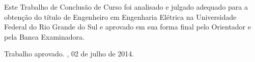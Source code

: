 \documentclass[
	12pt,				%
	openright,			%
	twoside,			%
	a4paper,			%
	brazil,
	french,				%
	english
	]{abntex2}
\begin{document}
%
% 
%
\begin{folhadeaprovacao}

  \begin{center}
    {\ABNTEXchapterfont\large\imprimirautor}

    \vspace*{\fill}\vspace*{\fill}
    \begin{center}
      \ABNTEXchapterfont\bfseries\Large\imprimirtitulo
    \end{center}
    \vspace*{\fill}
    
    \hspace{.45\textwidth}
    \begin{minipage}{.5\textwidth}
        Este Trabalho de Conclusão de Curso foi analisado e julgado adequado para a obtenção do título de Engenheiro em Engenharia Elétrica na Universidade Federal do Rio Grande do Sul e aprovado em sua forma final pelo Orientador e pela Banca Examinadora.
    \end{minipage}%
    \vspace*{\fill}
   \end{center}
        
   Trabalho aprovado. \imprimirlocal, 02 de julho de 2014.

      
   \begin{center}
    \vspace*{0.5cm}
    {\large\imprimirlocal}
    \par
    {\large\imprimirdata}
    \vspace*{1cm}
  \end{center}
  
\end{folhadeaprovacao}
\end{document}
